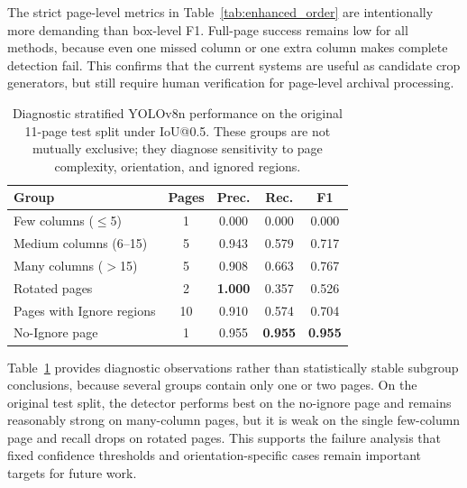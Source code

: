 \documentclass[12pt]{article}
\begin{document}
The strict page-level metrics in Table~\ref{tab:enhanced_order} are intentionally more demanding than box-level F1. Full-page success remains low for all methods, because even one missed column or one extra column makes complete detection fail. This confirms that the current systems are useful as candidate crop generators, but still require human verification for page-level archival processing.

\begin{table}[t]
\centering
\scriptsize\setlength{\tabcolsep}{3pt}
\caption{Diagnostic stratified YOLOv8n performance on the original 11-page test split under IoU@0.5. These groups are not mutually exclusive; they diagnose sensitivity to page complexity, orientation, and ignored regions.}
\label{tab:stratified_yolo}
\begin{tabular}{lcccc}
\toprule
Group & Pages & Prec. & Rec. & F1 \\
\midrule
Few columns ($\leq$5) & 1 & 0.000 & 0.000 & 0.000 \\
Medium columns (6--15) & 5 & 0.943 & 0.579 & 0.717 \\
Many columns ($>$15) & 5 & 0.908 & 0.663 & 0.767 \\
Rotated pages & 2 & \textbf{1.000} & 0.357 & 0.526 \\
Pages with Ignore regions & 10 & 0.910 & 0.574 & 0.704 \\
No-Ignore page & 1 & 0.955 & \textbf{0.955} & \textbf{0.955} \\
\bottomrule
\end{tabular}
\end{table}

Table~\ref{tab:stratified_yolo} provides diagnostic observations rather than statistically stable subgroup conclusions, because several groups contain only one or two pages. On the original test split, the detector performs best on the no-ignore page and remains reasonably strong on many-column pages, but it is weak on the single few-column page and recall drops on rotated pages. This supports the failure analysis that fixed confidence thresholds and orientation-specific cases remain important targets for future work.
\end{document}
